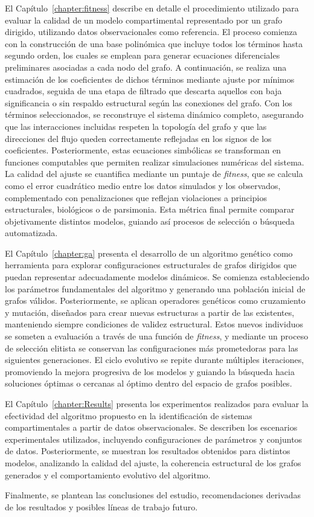 El Capítulo~\ref{chapter:fitness} describe en detalle el procedimiento utilizado para evaluar la calidad de un modelo compartimental representado por un grafo dirigido, utilizando datos observacionales como referencia. El proceso comienza con la construcción de una base polinómica que incluye todos los términos hasta segundo orden, los cuales se emplean para generar ecuaciones diferenciales preliminares asociadas a cada nodo del grafo. A continuación, se realiza una estimación de los coeficientes de dichos términos mediante ajuste por mínimos cuadrados, seguida de una etapa de filtrado que descarta aquellos con baja significancia o sin respaldo estructural según las conexiones del grafo. Con los términos seleccionados, se reconstruye el sistema dinámico completo, asegurando que las interacciones incluidas respeten la topología del grafo y que las direcciones del flujo queden correctamente reflejadas en los signos de los coeficientes. Posteriormente, estas ecuaciones simbólicas se transforman en funciones computables que permiten realizar simulaciones numéricas del sistema. La calidad del ajuste se cuantifica mediante un puntaje de \textit{fitness}, que se calcula como el error cuadrático medio entre los datos simulados y los observados, complementado con penalizaciones que reflejan violaciones a principios estructurales, biológicos o de parsimonia. Esta métrica final permite comparar objetivamente distintos modelos, guiando así procesos de selección o búsqueda automatizada.

El Capítulo~\ref{chapter:ga} presenta el desarrollo de un algoritmo genético como herramienta para explorar configuraciones estructurales de grafos dirigidos que puedan representar adecuadamente modelos dinámicos. Se comienza estableciendo los parámetros fundamentales del algoritmo y generando una población inicial de grafos válidos. Posteriormente, se aplican operadores genéticos como cruzamiento y mutación, diseñados para crear nuevas estructuras a partir de las existentes, manteniendo siempre condiciones de validez estructural. Estos nuevos individuos se someten a evaluación a través de una función de \textit{fitness}, y mediante un proceso de selección elitista se conservan las configuraciones más prometedoras para las siguientes generaciones. El ciclo evolutivo se repite durante múltiples iteraciones, promoviendo la mejora progresiva de los modelos y guiando la búsqueda hacia soluciones óptimas o cercanas al óptimo dentro del espacio de grafos posibles.

El Capítulo~\ref{chapter:Results} presenta los experimentos realizados para evaluar la efectividad del algoritmo propuesto en la identificación de sistemas compartimentales 
a partir de datos observacionales. Se describen los escenarios experimentales utilizados, incluyendo configuraciones de parámetros y conjuntos de datos. 
Posteriormente, se muestran los resultados obtenidos para distintos modelos, analizando la calidad del ajuste, la coherencia estructural de los grafos generados y 
el comportamiento evolutivo del algoritmo. 

Finalmente, se plantean las conclusiones del estudio, recomendaciones derivadas de los resultados y posibles líneas de trabajo futuro.